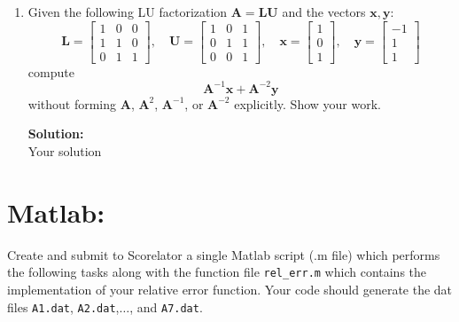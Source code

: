 \documentclass[]{article}
\newcommand{\bbm}{\begin{bmatrix}}		%
\newcommand{\ebm}{\end{bmatrix}}		%
\newcommand{\x}{\bm{x}}					%
\newcommand{\y}{\bm{y}}					%
\newcommand{\A}{\bm{A}}					%
\newcommand{\solution}{\vskip 0.5cm \textbf{\large Solution:} \\}
\begin{document}
\begin{enumerate}
	\solution
	\begin{enumerate}
		\item Your solution
		\item Your solution
	\end{enumerate}

	\item Given the following LU factorization $\A=\bm{LU}$ and the vectors $\x,\y$:
	\[
		\bm{L}=\bbm 1&0&0\\1&1&0\\0&1&1\ebm,\quad \bm{U}=\bbm 1&0&1\\0&1&1\\0&0&1\ebm,\quad \x=\bbm 1\\0\\1\ebm, \quad \y=\bbm -1\\1\\1\ebm
	\]
	compute
	\[
		\A^{-1}\x + \A^{-2}\y
	\]
	without forming $\A$, $\A^2$, $\A^{-1}$, or $\A^{-2}$ explicitly. Show your work.

	\solution
	Your solution

\end{enumerate}





\section*{Matlab:}
Create and submit to Scorelator a single Matlab script (.m file) which performs the following tasks along with the function file \texttt{rel\_err.m} which contains the implementation of your relative error function. Your code should generate the dat files \texttt{A1.dat}, \texttt{A2.dat},$\dots$, and \texttt{A7.dat}.
\end{document}
